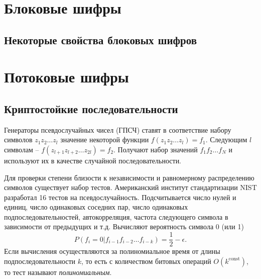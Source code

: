 \documentclass[10pt,a4paper]{book}
\begin{document}






\chapter{Блоковые шифры}\label{chapter-block-ciphers}









\section{Некоторые свойства блоковых шифров}









\chapter{Потоковые шифры}\label{chapter-stream-ciphers}



\section{Криптостойкие последовательности} %

Генераторы псевдослучайных чисел (ГПСЧ) ставят в соответствие набору символов $z_{1} z_{2} \dots z_{l}$ значение некоторой функции $f(z_{1} z_{2} \dots z_{l}) = f_{1}$. Следующим $l$ символам -- $f(z_{l+1} z_{l+2} \dots z_{2l}) = f_{2}$. Получают набор значений $f_{1} f_{2} \dots f_{N}$ и используют их в качестве случайной последовательности.

Для проверки степени близости к независимости и равномерному распределению символов существует набор тестов. Американский институт стандартизации NIST разработал 16 тестов на псевдослучайность. Подсчитывается число нулей и единиц, число одинаковых соседних пар, число одинаковых подпоследовательностей, автокорреляция, частота следующего символа в зависимости от предыдущих и т.д. Вычисляют вероятность символа 0 (или 1)
\[
    P(f_i = 0 | f_{i-1} f_{i-2} \dots f_{i-k}) = \frac{1}{2} - \epsilon.
\]
Если вычисления осуществляются за полиномиальное время от длины подпоследовательности $k$, то есть с количеством битовых операций $O(k^{\textrm{const}})$, то тест называют \emph{полиномиальным}.
\end{document}
